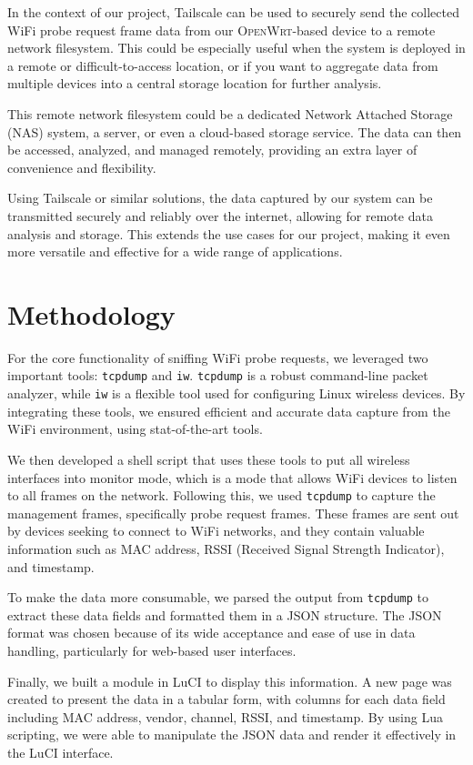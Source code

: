 \documentclass{article}
\begin{document}
In the context of our project, Tailscale can be used to securely send the collected WiFi probe request frame data from our \textsc{OpenWrt}-based device to a remote network filesystem. This could be especially useful when the system is deployed in a remote or difficult-to-access location, or if you want to aggregate data from multiple devices into a central storage location for further analysis.

This remote network filesystem could be a dedicated Network Attached Storage (NAS) system, a server, or even a cloud-based storage service. The data can then be accessed, analyzed, and managed remotely, providing an extra layer of convenience and flexibility.

Using Tailscale or similar solutions, the data captured by our system can be transmitted securely and reliably over the internet, allowing for remote data analysis and storage. This extends the use cases for our project, making it even more versatile and effective for a wide range of applications.

\section{Methodology}

For the core functionality of sniffing WiFi probe requests, we leveraged two important tools: \texttt{tcpdump} and \texttt{iw}. \texttt{tcpdump} is a robust command-line packet analyzer, while \texttt{iw} is a flexible tool used for configuring Linux wireless devices. By integrating these tools, we ensured efficient and accurate data capture from the WiFi environment, using stat-of-the-art tools.

We then developed a shell script that uses these tools to put all wireless interfaces into monitor mode, which is a mode that allows WiFi devices to listen to all frames on the network. Following this, we used \texttt{tcpdump} to capture the management frames, specifically probe request frames. These frames are sent out by devices seeking to connect to WiFi networks, and they contain valuable information such as MAC address, RSSI (Received Signal Strength Indicator), and timestamp. 

To make the data more consumable, we parsed the output from \texttt{tcpdump} to extract these data fields and formatted them in a JSON structure. The JSON format was chosen because of its wide acceptance and ease of use in data handling, particularly for web-based user interfaces. 

Finally, we built a module in LuCI to display this information. A new page was created to present the data in a tabular form, with columns for each data field including MAC address, vendor, channel, RSSI, and timestamp. By using Lua scripting, we were able to manipulate the JSON data and render it effectively in the LuCI interface. 
\end{document}
